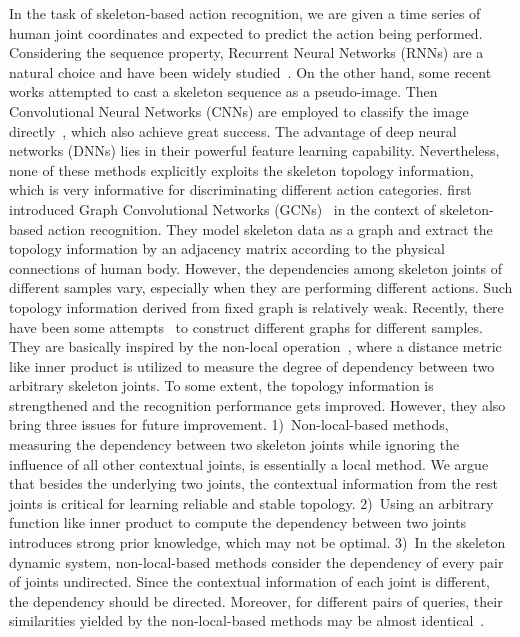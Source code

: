 \documentclass[sigconf]{acmart}
\begin{document}
In the task of skeleton-based action recognition, we are given a time series of human joint coordinates and expected to predict the action being performed. Considering the sequence property, Recurrent Neural Networks (RNNs) are a natural choice and have been widely studied~\cite{shahroudy,zhang:J,zhang2018adding,liu2016spatio,zhang2017view}. On the other hand, some recent works attempted to cast a skeleton sequence as a pseudo-image. Then Convolutional Neural Networks (CNNs) are employed to classify the image directly~\cite{li2017skeleton,lili}, which also achieve great success. The advantage of deep neural networks (DNNs) lies in their powerful feature learning capability. Nevertheless, none of these methods explicitly exploits the skeleton topology information, which is very informative for discriminating different action categories. \cite{yanspatial} first introduced Graph Convolutional Networks (GCNs)~\cite{kipf2017} in the context of skeleton-based action recognition. They model skeleton data as a graph and extract the topology information by an adjacency matrix according to the physical connections of human body. However, the dependencies among skeleton joints of different samples vary, especially when they are performing different actions. Such topology information derived from fixed graph is relatively weak. Recently, there have been some attempts~\cite{shi2019two,zhang2019semantics,li2019spatio,liu2020} to construct different graphs for different samples. They are basically inspired by the non-local operation~\cite{buades2005non}, where a distance metric like inner product is utilized to measure the degree of dependency between two arbitrary skeleton joints. To some extent, the topology information is strengthened and the recognition performance gets improved. However, they also bring three issues for future improvement. 1)~Non-local-based methods, measuring the dependency between two skeleton joints while ignoring the influence of all other contextual joints, is essentially a local method. We argue that besides the underlying two joints, the contextual information from the rest joints is critical for learning reliable and stable topology. 2)~Using an arbitrary function like inner product to compute the dependency between two joints introduces strong prior knowledge, which may not be optimal. 3)~In the skeleton dynamic system, non-local-based methods consider the dependency of every pair of joints undirected. Since the contextual information of each joint is different, the dependency should be directed. Moreover, for different pairs of queries, their similarities yielded by the non-local-based methods may be almost identical~\cite{cao2019gcnet}.
\end{document}
